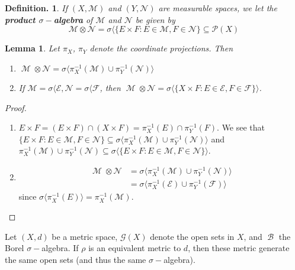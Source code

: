\documentclass[12pt, a4paper]{memoir}
\newtheorem{lemma}[theorem]{Lemma}
\theoremstyle{nonumberplain}
\newtheorem{definition}{Definition.}
\newtheorem{proof}{Proof}
\DeclareMathOperator{\M}{\mathcal{M}}
\DeclareMathOperator{\B}{\mathcal{B}}
\begin{document}
\begin{definition}
    If $(X,\mathcal{M})$ and $(Y,\mathcal{N})$ are measurable spaces, we let the \textbf{product $\sigma-$algebra} of $\mathcal{M}$ and $\mathcal{N}$ be given by
    \begin{equation*}
        \mathcal{M}\otimes\mathcal{N}=\sigma\langle\{E\times F:E\in\mathcal{M},F\in\mathcal{N}\}\subseteq\mathcal{P}(X)
    \end{equation*}
\end{definition}
\begin{lemma}
    Let $\pi_X$, $\pi_Y$ denote the coordinate projections.
    Then
    \begin{enumerate}
        \item $\M\otimes\mathcal{N}=\sigma\langle\pi_X^{-1}(\mathcal{M})\cup\pi_Y^{-1}(\mathcal{N})\rangle$
        \item If $\mathcal{M}=\sigma\langle\mathcal{E},\mathcal{N}=\sigma\langle\mathcal{F}$, then $\M\otimes\mathcal{N}=\sigma\langle\{X\times F:E\in\mathcal{E},F\in\mathcal{F}\}\rangle$.
    \end{enumerate}
\end{lemma}
\begin{proof}
    \begin{enumerate}
        \item $E\times F=(E\times F)\cap(X\times F)=\pi^{-1}_X(E)\cap\pi^{-1}_Y(F)$.
            We see that $\{E\times F:E\in\mathcal{M},F\in\mathcal{N}\}\subseteq\sigma\langle\pi_X^{-1}(\mathcal{M})\cup\pi_Y^{-1}(\mathcal{N})\rangle$
            and $\pi_X^{-1}(\mathcal{M})\cup\pi_Y^{-1}(\mathcal{N})\subseteq\sigma\langle\{E\times F:E\in\mathcal{M},F\in\mathcal{N}\}\rangle$.
        \item
            \begin{align*}
                \M\otimes\mathcal{N} &= \sigma\langle\pi_X^{-1}(\mathcal{M})\cup\pi_Y^{-1}(\mathcal{N})\rangle\\
                                     &= \sigma\langle\pi_X^{-1}(\mathcal{E})\cup\pi_Y^{-1}(\mathcal{F})\rangle
            \end{align*}
            since $\sigma\langle\pi_X^{-1}(E)\rangle=\pi_X^{-1}(\mathcal{M})$.
    \end{enumerate}
\end{proof}
Let $(X,d)$ be a metric space, $\mathcal{G}(X)$ denote the open sets in $X$, and $\B$ the Borel $\sigma-$algebra.
If $\rho$ is an equivalent metric to $d$, then these metric generate the same open sets (and thus the same $\sigma-$algebra).
\end{document}
